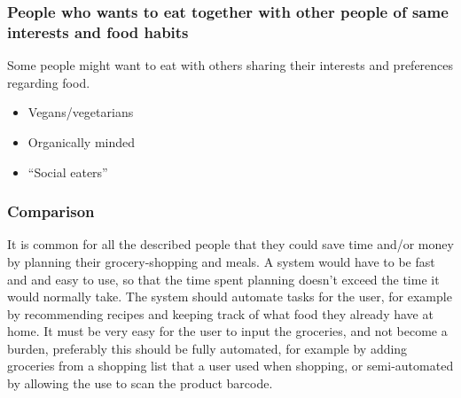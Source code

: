 \subsubsection{People who wants to eat together with other people of same interests and food habits}
Some people might want to eat with others sharing their interests and preferences regarding food.
\begin{itemize}
\item Vegans/vegetarians
\item Organically minded
\item “Social eaters”
\end{itemize}

\subsubsection{Comparison}
It is common for all the described people that they could save time and/or money by planning their grocery-shopping and meals. A system would have to be fast and and easy to use, so that the time spent planning doesn't exceed the time it would normally take. The system should automate tasks for the user, for example by recommending recipes and keeping track of what food they already have at home. It must be very easy for the user to input the groceries, and not become a burden, preferably this should be fully automated, for example by adding groceries from a shopping list that a user used when shopping, or semi-automated by allowing the use to scan the product barcode.


